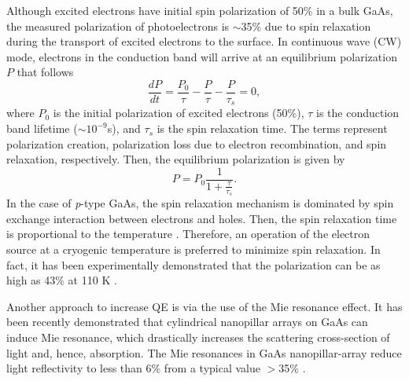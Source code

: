 Although excited electrons have initial spin polarization of 50\% in a bulk GaAs, the measured polarization of photoelectrons is $\sim$35\% due to spin relaxation during the transport of excited electrons to the surface. In continuous wave (CW) mode, electrons in the conduction band will arrive at an equilibrium polarization $P$ that follows
\begin{equation}
	\frac{dP}{dt} = \frac{P_0}{\tau} - \frac{P}{\tau} - \frac{P}{\tau_s} =0,
\end{equation}
where $P_0$ is the initial polarization of excited electrons (50\%), $\tau$ is the conduction band lifetime ($\sim 10^{-9}$s), and $\tau_s$ is the spin relaxation time. The terms represent polarization creation, polarization loss due to electron recombination, and spin relaxation, respectively. Then, the equilibrium polarization is given by \cite{liu2017_ComprehensiveEvaluationFactors}
\begin{equation}
	P = P_0 \frac{1}{1+ \frac{\tau}{\tau_s}}.
\end{equation}
In the case of \emph{p}-type GaAs, the spin relaxation mechanism is dominated by spin exchange interaction between electrons and holes. Then, the spin relaxation time is proportional to the temperature \cite{liu2017_ComprehensiveEvaluationFactors,song2002_SpinRelaxationConduction}. Therefore, an operation of the electron source at a cryogenic temperature is preferred to minimize spin relaxation. In fact, it has been experimentally demonstrated that the polarization can be as high as 43\% at 110 K \cite{pierce1980_GaAsSpinPolarized}.

Another approach to increase QE is via the use of the Mie resonance effect.
It has been recently demonstrated that cylindrical nanopillar arrays on GaAs can induce Mie resonance, which drastically increases the scattering cross-section of light and, hence, absorption.
The Mie resonances in GaAs nanopillar-array reduce light reflectivity to less than 6\% from a typical value $>$35\% \cite{peng2019optical}.

